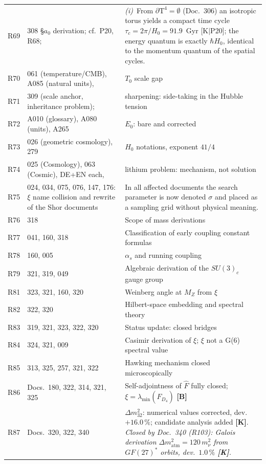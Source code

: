 \begin{longtable}{@{}p{0.9cm}p{3.1cm}p{10.2cm}@{}}
R69 & 308 \S{}$a_0$ derivation; cf.\ P20, R68; & \emph{(i)}~From $\partial\text{T}^4 = \emptyset$ (Doc.~306) an isotropic torus yields a compact time cycle $\tau_c = 2\pi/H_0 = 91.9$~Gyr [K$|$P20]; the energy quantum is exactly $\hbar H_0$, identical to the momentum quantum of the spatial cycles. \\
R70 & 061 (temperature/CMB), A085 (natural units), & $T_0$ scale gap \\
R71 & 309 (scale anchor, inheritance problem); & sharpening: side-taking in the Hubble
tension \\
R72 & A010 (glossary), A080 (units), A265 & $E_0$: bare and
corrected \\
R73 & 026 (geometric cosmology), 279 & $H_0$ notations, exponent $41/4$ \\
R74 & 025 (Cosmology), 063 (Cosmic), DE+EN each, & lithium problem: mechanism,
not solution \\
R75 & 024, 034, 075, 076, 147, 176: $\xi$ name
collision and rewrite of the Shor documents & In all affected documents the search parameter is now denoted $\sigma$ and placed as a sampling grid without physical meaning. \\
R76 & 318 & Scope of mass derivations \\
R77 & 041, 160, 318 & Classification of early coupling constant formulas \\
R78 & 160, 005 & $\alpha_s$ and running coupling \\
R79 & 321, 319, 049 & Algebraic derivation of the $SU(3)_c$ gauge group \\
R81 & 323, 321, 160, 320 & Weinberg angle at $M_Z$ from $\xi$ \\
R82 & 322, 320 & Hilbert-space embedding and spectral theory \\
R83 & 319, 321, 323, 322, 320 & Status update: closed bridges \\
R84 & 324, 321, 009 & Casimir derivation of $\xi$; $\xi$ not a G(6) spectral value \\
R85 & 313, 325, 257, 321, 322 & Hawking mechanism closed microscopically \\
R86 & Docs.~180, 322, 314, 321, 325 & Self-adjointness of $\hat{F}$ fully closed; $\xi = \lambda_{\min}(\hat{F}_{D_4})$ \textbf{[B]} \\
R87 & Docs.~320, 322, 340 & $\Delta m_{32}^2$: numerical values corrected, dev. $+16.0\,\%$; candidate analysis added \textbf{[K]}. \emph{Closed by Doc.~340 (R103): Galois derivation $\Delta m^2_\text{atm}=120\,m_\nu^2$ from $GF(27)^*$ orbits, dev.\ $1.0\,\%$ \textbf{[K]}.} \\

\end{longtable}
